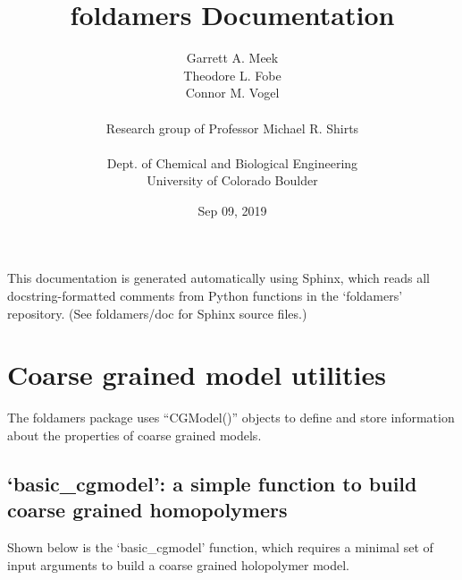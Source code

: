 \documentclass[letterpaper,12pt,english,openany,oneside]{sphinxmanual}
\title{foldamers Documentation}
\date{Sep 09, 2019}
\author{Garrett A. Meek\\Theodore L. Fobe\\Connor M. Vogel\\ \\Research group of Professor Michael R. Shirts\\ \\Dept. of Chemical and Biological Engineering\\University of Colorado Boulder}
\begin{document}
\pagestyle{empty}
\maketitle
\pagestyle{plain}
\sphinxtableofcontents
\pagestyle{normal}
\label{\detokenize{index::doc}}


This documentation is generated automatically using Sphinx, which reads all docstring-formatted comments from Python functions in the ‘foldamers’ repository.  (See foldamers/doc for Sphinx source files.)


\chapter{Coarse grained model utilities}
\label{\detokenize{cg_model:coarse-grained-model-utilities}}\label{\detokenize{cg_model::doc}}
The foldamers package uses “CGModel()” objects to define and store information about the properties of coarse grained models.


\section{‘basic\_cgmodel’: a simple function to build coarse grained homopolymers}
\label{\detokenize{cg_model:basic-cgmodel-a-simple-function-to-build-coarse-grained-homopolymers}}
Shown below is the ‘basic\_cgmodel’ function, which requires a minimal set of input arguments to build a coarse grained holopolymer model.

\label{\detokenize{cg_model:module-cg_model.cgmodel}}
\end{document}
